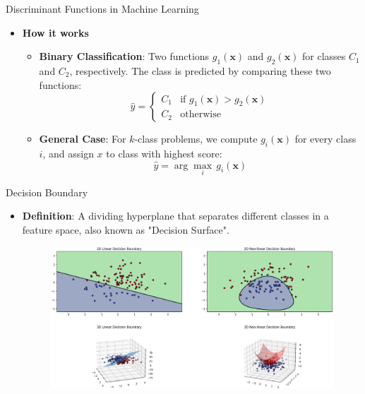 \documentclass[serif, aspectratio=169]{beamer}
\begin{document}
\begin{frame}{Discriminant Functions in Machine Learning}
    \begin{itemize}
        \item \textbf{How it works}
        \medskip
        \begin{itemize}\itemsep1.5em
            \item \justifying \textbf{Binary Classification}: Two functions \textbf{$g_1(\mathbf{x})$} and \textbf{$g_2(\mathbf{x})$} for classes $C_1$ and $C_2$, respectively. The class is predicted by comparing these two functions:
            \[
                \hat{y} =
                \begin{cases} 
                    C_1 & \text{if } g_1(\mathbf{x}) > g_2(\mathbf{x}) \\
                    C_2 & \text{otherwise}
                \end{cases}
            \]

            \item \justifying \textbf{General Case}: For $k$-class problems, we compute \textbf{$g_i(\mathbf{x})$} for every class $i$, and assign \textbf{$x$} to class with highest score:
            $$
                \hat{y} = \arg \max_i \, g_i(\mathbf{x})
            $$
        \end{itemize}
    \end{itemize}
\end{frame}

\begin{frame}{Decision Boundary}
    \begin{itemize}
        \item \justifying \textbf{Definition}: A dividing hyperplane that separates different classes in a feature space, also known as "Decision Surface".
        \medskip
        \begin{figure}
            \centering
            \includegraphics[width=.85\linewidth]{pic/Figure_24.png}
        \end{figure}
    \end{itemize}
\end{frame}
\end{document}
